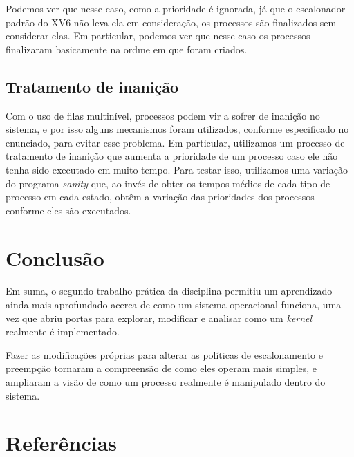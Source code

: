 \documentclass{article}
\begin{document}
Podemos ver que nesse caso, como a prioridade é ignorada, já que o escalonador
padrão do XV6 não leva ela em consideração, os processos são finalizados sem
considerar elas. Em particular, podemos ver que nesse caso os processos
finalizaram basicamente na ordme em que foram criados.

\subsection{Tratamento de inanição}

Com o uso de filas multinível, processos podem vir a sofrer de inanição no
sistema, e por isso alguns mecanismos foram utilizados, conforme especificado
no enunciado, para evitar esse problema. Em particular, utilizamos um processo
de tratamento de inanição que aumenta a prioridade de um processo caso ele não
tenha
sido executado em muito tempo. Para testar isso, utilizamos uma variação do
programa \textit{sanity} que, ao invés de obter os tempos médios de cada tipo
de processo em cada estado, obtêm a variação das prioridades dos processos
conforme eles são executados.

\section{Conclusão}

Em suma, o segundo trabalho prática da disciplina
permitiu um aprendizado ainda mais aprofundado acerca de como um sistema
operacional funciona, uma vez que abriu portas para explorar, modificar e
analisar como um \textit{kernel} realmente é implementado.

Fazer as modificações próprias para alterar as políticas de escalonamento e
preempção tornaram a compreensão de como eles operam mais simples, e ampliaram
a visão de como um processo realmente é manipulado dentro do sistema.

\section{Referências}
\end{document}
